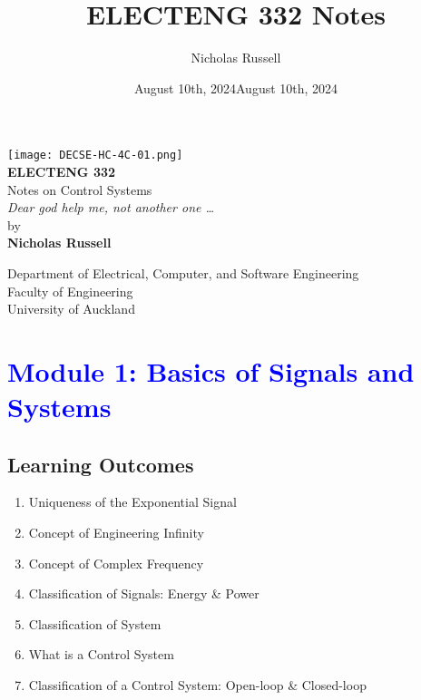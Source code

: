 \documentclass[12pt]{report}
\title{ELECTENG 332 Notes}
\author{Nicholas Russell}
\date{August 10th, 2024}
\begin{document}
\begin{titlepage}
\centering

\texttt{[image: DECSE-HC-4C-01.png]}\\[1cm] %


{\LARGE \textbf{ELECTENG 332}}\\[0.5cm]
{\Large Notes on Control Systems}\\[0.5cm]

{\textit{Dear god help me, not another one \dots}}\\[2cm]

{\large by}\\[0.3cm]
{\large \textbf{Nicholas Russell}}\\[1.4cm]
{\large \date{August 10th, 2024}}

\vfill %

{\large Department of Electrical, Computer, and Software Engineering}\\[0.3cm]
{\large Faculty of Engineering}\\[0.3cm]
{\large University of Auckland}




\end{titlepage}



\tableofcontents
\newpage

\chapter{\textcolor{blue}{Module 1: Basics of Signals and Systems}}

\section{Learning Outcomes}

\begin{enumerate}[label=\blacktriangleright, leftmargin=*, itemsep=0.5em]
    \item Uniqueness of the Exponential Signal
    \item Concept of Engineering Infinity
    \item Concept of Complex Frequency
    \item Classification of Signals: Energy \& Power
    \item Classification of System
    \item What is a Control System
    \item Classification of a Control System: Open-loop \& Closed-loop
\end{enumerate}
\end{document}
